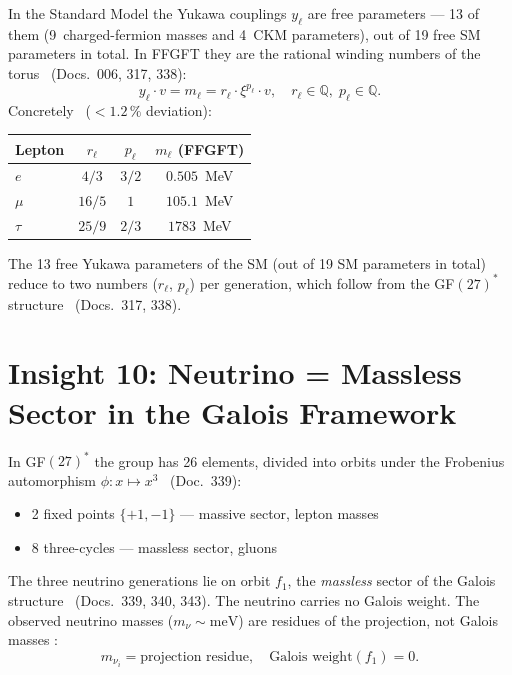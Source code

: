 In the Standard Model the Yukawa couplings $y_\ell$ are free parameters ---
13 of them (9~charged-fermion masses and 4~CKM parameters), out of 19 free SM parameters in total. In FFGFT they are the rational winding numbers of the torus
\BM\ (Docs.~006, 317, 338):
\begin{equation}
  y_\ell\cdot v = m_\ell = r_\ell\cdot\xi^{p_\ell}\cdot v,
  \quad r_\ell\in\mathbb{Q},\; p_\ell\in\mathbb{Q}.
  \label{eq:yukawa_winding}
\end{equation}
Concretely \KM\ ($<1.2\,\%$ deviation):
\begin{center}
\begin{tabular}{@{}lccc@{}}
\toprule
Lepton & $r_\ell$ & $p_\ell$ & $m_\ell$ (FFGFT) \\
\midrule
$e$    & $4/3$   & $3/2$ & $0.505$~MeV \\
$\mu$  & $16/5$  & $1$   & $105.1$~MeV \\
$\tau$ & $25/9$  & $2/3$ & $1783$~MeV \\
\bottomrule
\end{tabular}
\end{center}
The 13 free Yukawa parameters of the SM (out of 19 SM parameters in total) reduce to two numbers
($r_\ell$, $p_\ell$) per generation, which follow from the GF$(27)^*$
structure \BM\ (Docs.~317, 338).

\section{Insight 10: Neutrino = Massless Sector in the Galois Framework}

In GF$(27)^*$ the group has 26 elements, divided into orbits under the
Frobenius automorphism $\phi: x\mapsto x^3$ \BM\ (Doc.~339):
\begin{itemize}
  \item 2 fixed points $\{+1,-1\}$ --- massive sector, lepton masses
  \item 8 three-cycles --- massless sector, gluons
\end{itemize}

The three neutrino generations lie on orbit $f_1$, the \emph{massless}
sector of the Galois structure \BM\ (Docs.~339, 340, 343).
The neutrino carries no Galois weight. The observed neutrino masses
($m_\nu \sim \text{meV}$) are residues of the projection, not Galois
masses \KM:
\begin{equation}
  m_{\nu_i} = \text{projection residue},\quad
  \text{Galois weight}(f_1) = 0.
  \label{eq:neutrino_galois}
\end{equation}

